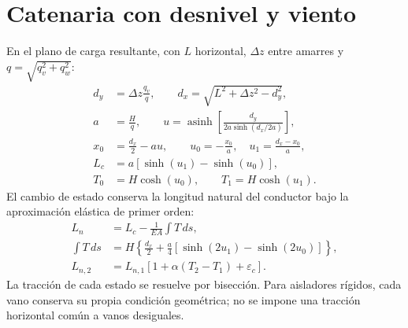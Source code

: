 \section{Catenaria con desnivel y viento}
En el plano de carga resultante, con $L$ horizontal, $\Delta z$ entre amarres y $q=\sqrt{q_v^2+q_w^2}$:
\begin{align}
d_y&=\Delta z\frac{q_v}{q},\qquad
d_x=\sqrt{L^2+\Delta z^2-d_y^2},\\
a&=\frac{H}{q},\qquad
u=\operatorname{asinh}\!\left[\frac{d_y}{2a\sinh(d_x/2a)}\right],\\
x_0&=\frac{d_x}{2}-au,\qquad
u_0=-\frac{x_0}{a},\quad u_1=\frac{d_x-x_0}{a},\\
L_c&=a[\sinh(u_1)-\sinh(u_0)],\\
T_0&=H\cosh(u_0),\qquad T_1=H\cosh(u_1).
\end{align}
El cambio de estado conserva la longitud natural del conductor bajo la aproximación elástica de primer orden:
\begin{align}
L_n&=L_c-\frac{1}{EA}\int T\,ds,\\
\int T\,ds&=H\left\{\frac{d_x}{2}+\frac{a}{4}[\sinh(2u_1)-\sinh(2u_0)]\right\},\\
L_{n,2}&=L_{n,1}[1+\alpha(T_2-T_1)+\varepsilon_c].
\end{align}
La tracción de cada estado se resuelve por bisección. Para aisladores rígidos, cada vano conserva su propia condición geométrica; no se impone una tracción horizontal común a vanos desiguales.
